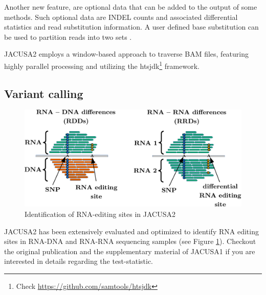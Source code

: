 \documentclass[10pt,a4paper]{article} \usepackage[utf8]{inputenc}
\begin{document}
Another new feature, are optional data that can be added to the output of some methods.
Such optional data are INDEL counts and associated differential statistics and read substitution
information. A user defined base substitution can be used to partition reads into two sets
.

JACUSA2 employs a window-based approach to traverse BAM \cite{HengLi2009} files, featuring highly
parallel processing and utilizing the htsjdk\footnote{Check \url{https://github.com/samtools/htsjdk}} 
framework.
\subsection{Variant calling}
\begin{figure}[ht]
  \centering
  \includegraphics[width=.6\textwidth]{figures/dres_cropped}
  \caption{Identification of RNA-editing sites in JACUSA2}
  \label{fig:dres}
\end{figure}
JACUSA2 has been extensively evaluated and optimized to identify RNA editing sites in RNA-DNA and
RNA-RNA sequencing samples (see Figure \ref{fig:dres}). Checkout the original publication and the
supplementary material of JACUSA1 \cite{Piechotta2017} if you are interested in details regarding
the test-statistic.
\end{document}
